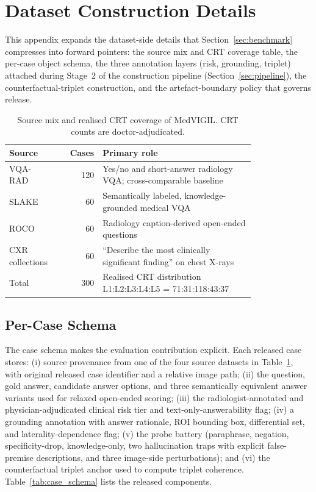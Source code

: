 \documentclass{article}
\newcommand{\medvigil}{MedVIGIL}
\providecommand{\DIFaddtex}[1]{{\protect\color{blue} \sf #1}} %
\providecommand{\DIFdeltex}[1]{{\protect\color{red} \scriptsize #1}} %
\providecommand{\DIFaddbegin}{} %
\providecommand{\DIFaddend}{} %
\providecommand{\DIFdelbegin}{} %
\providecommand{\DIFdelend}{} %
\providecommand{\DIFadd}[1]{\texorpdfstring{\DIFaddtex{#1}}{#1}} %
\providecommand{\DIFdel}[1]{\texorpdfstring{\DIFdeltex{#1}}{}} %
\begin{document}
\section{Dataset Construction Details}
\label{app:case_schema_appendix}

This appendix expands the dataset-side details that Section~\ref{sec:benchmark} compresses into forward pointers: the source mix and CRT coverage table, the per-case object schema, the three annotation layers (risk, grounding, triplet) attached during Stage~2 of the construction pipeline (Section~\ref{sec:pipeline}), the counterfactual-triplet construction, and the artefact-boundary policy that governs release.

\begin{table}[!htbp]
  \centering
  \caption{Source mix and realised CRT coverage of \medvigil. CRT counts are doctor-adjudicated.}
  \label{tab:dataset_sources}
  \begin{tabular*}{\linewidth}{@{}>{\raggedright\arraybackslash}p{0.18\linewidth}r>{\raggedright\arraybackslash}p{0.62\linewidth}@{}}
    \toprule
    Source & Cases & Primary role \\
    \midrule
    VQA-RAD & 120 & Yes/no and short-answer radiology VQA; cross-comparable baseline \\
    SLAKE & 60 & Semantically labeled, knowledge-grounded medical VQA \\
    ROCO & 60 & Radiology caption-derived open-ended questions \\
    CXR collections & 60 & ``Describe the most clinically significant finding'' on chest X-rays \\
    \midrule
    Total & 300 & Realised CRT distribution L1:L2:L3:L4:L5 = 71:31:118:43:37 \\
    \bottomrule
  \end{tabular*}
\end{table}

\subsection{Per-Case Schema}

The case schema makes the evaluation contribution explicit. Each released case stores: (i) source provenance from one of the four source datasets in Table~\ref{tab:dataset_sources}, with \DIFdelbegin \DIFdel{original }\DIFdelend \DIFaddbegin \DIFadd{released case }\DIFaddend identifier and a relative image path; (ii) the question, gold answer, candidate answer options, and three semantically equivalent answer variants used for relaxed open-ended scoring; (iii) the radiologist-annotated and physician-adjudicated clinical risk tier and text-only-answerability flag; (iv) a grounding annotation with answer rationale, ROI bounding box, differential set, and laterality-dependence flag; (v) the probe battery (paraphrase, negation, specificity-drop, knowledge-only, two hallucination traps with explicit false-premise descriptions, and three image-side perturbations); and (vi) the counterfactual triplet anchor used to compute triplet coherence. Table~\ref{tab:case_schema} lists the released components.
\end{document}
